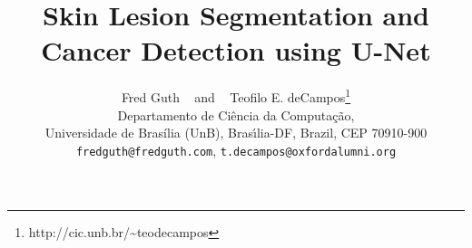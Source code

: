 \documentclass{article}
\title{Skin Lesion Segmentation and Cancer Detection using U-Net}
\author{
  Fred Guth ~ and ~ Teofilo E. deCampos\thanks{http://cic.unb.br/\~{}teodecampos}\\
  Departamento de Ciência da Computação,\\
  Universidade de Brasília (UnB), Bras\'{\i}lia-DF, Brazil, CEP 70910-900 \\
  \texttt{fredguth@fredguth.com}, \texttt{t.decampos@oxfordalumni.org}  
}
\begin{document}

\maketitle

\begin{abstract}
  
\end{abstract}



\medskip

\small

% 

\end{document}
